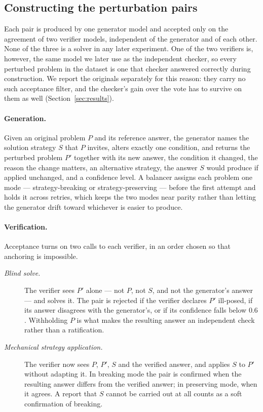 \subsection{Constructing the perturbation pairs}
\label{sec:construction}

Each pair is produced by one generator model and accepted only on the
agreement of two verifier models, independent of the generator and of each
other. None of the three is a solver in any later experiment. One of the two
verifiers is, however, the same model we later use as the independent checker,
so every perturbed problem in the dataset is one that checker answered
correctly during construction. We report the originals separately for this
reason: they carry no such acceptance filter, and the checker's gain over the
vote has to survive on them as well (Section~\ref{sec:results}).

\paragraph{Generation.}
Given an original problem $P$ and its reference answer, the generator names the
solution strategy $S$ that $P$ invites, alters exactly one condition, and
returns the perturbed problem $P'$ together with its new answer, the condition
it changed, the reason the change matters, an alternative strategy, the answer
$S$ would produce if applied unchanged, and a confidence level. A balancer
assigns each problem one mode --- strategy-breaking or strategy-preserving ---
before the first attempt and holds it across retries, which keeps the two modes
near parity rather than letting the generator drift toward whichever is easier
to produce.

\paragraph{Verification.}
Acceptance turns on two calls to each verifier, in an order chosen so that
anchoring is impossible.

\begin{description}
\item[\textnormal{\emph{Blind solve.}}] The verifier sees $P'$ alone --- not
  $P$, not $S$, and not the generator's answer --- and solves it. The pair is
  rejected if the verifier declares $P'$ ill-posed, if its answer disagrees
  with the generator's, or if its confidence falls below $0.6$. Withholding $P$
  is what makes the resulting answer an independent check rather than a
  ratification.
\item[\textnormal{\emph{Mechanical strategy application.}}] The verifier now
  sees $P$, $P'$, $S$ and the verified answer, and applies $S$ to $P'$ without
  adapting it. In breaking mode the pair is confirmed when the resulting answer
  differs from the verified answer; in preserving mode, when it agrees. A
  report that $S$ cannot be carried out at all counts as a soft confirmation of
  breaking.
\end{description}

